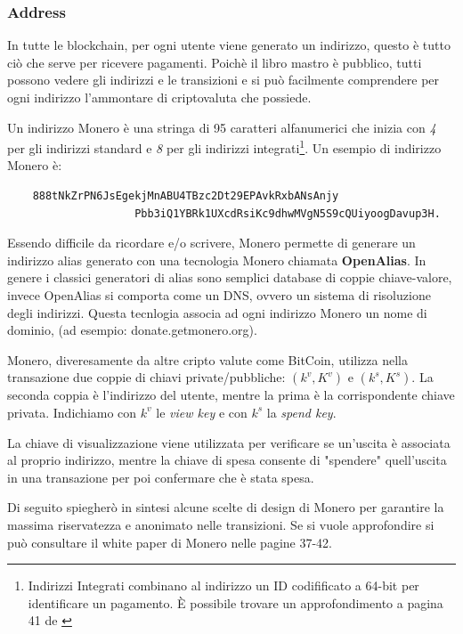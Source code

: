 \documentclass[12pt,a4paper]{article}
\begin{document}
\subsubsection*{Address}
In tutte le blockchain, per ogni utente viene generato un indirizzo, questo è
tutto ciò che serve per ricevere pagamenti. Poichè il libro mastro è pubblico,
tutti possono vedere gli indirizzi e le transizioni e si può facilmente
comprendere per ogni indirizzo l'ammontare di criptovaluta che possiede.

Un indirizzo Monero è una stringa di 95 caratteri alfanumerici che inizia con
\textit{4} per gli indirizzi standard e \textit{8} per gli indirizzi
integrati\footnote{Indirizzi Integrati combinano al indirizzo un ID codifificato
a 64-bit per identificare un pagamento. È possibile trovare un approfondimento a
pagina 41 de \cite{Zero To Monero}}. Un esempio di indirizzo Monero è:

\begin{verbatim}
    888tNkZrPN6JsEgekjMnABU4TBzc2Dt29EPAvkRxbANsAnjy
                    Pbb3iQ1YBRk1UXcdRsiKc9dhwMVgN5S9cQUiyoogDavup3H.
\end{verbatim}

Essendo difficile da ricordare e/o scrivere, Monero permette di generare un
indirizzo alias generato con una tecnologia Monero chiamata \textbf{OpenAlias}.
In genere i classici generatori di alias sono semplici database di coppie
chiave-valore, invece OpenAlias si comporta come un DNS, ovvero un sistema di
risoluzione degli indirizzi. Questa tecnlogia associa ad ogni indirizzo Monero
un nome di dominio, (ad esempio: donate.getmonero.org).

Monero, diveresamente da altre cripto valute come BitCoin, utilizza nella
transazione due coppie di chiavi private/pubbliche: $(k^v, K^v)$ e $(k^s, K^s)$.
La seconda coppia è l'indirizzo del utente, mentre la prima è la corrispondente
chiave privata. Indichiamo con $k^v$ le \textit{view key} e con $k^s$ la
\textit{spend key}.

La chiave di visualizzazione viene utilizzata per verificare se un'uscita è
associata al proprio indirizzo, mentre la chiave di spesa consente di "spendere"
quell'uscita in una transazione per poi confermare che è stata spesa.

Di seguito spiegherò in sintesi alcune scelte di design di Monero per garantire
la massima riservatezza e anonimato nelle transizioni. Se si vuole approfondire
si può consultare il white paper di Monero \cite{Zero To Monero} nelle pagine
37-42.
\end{document}

